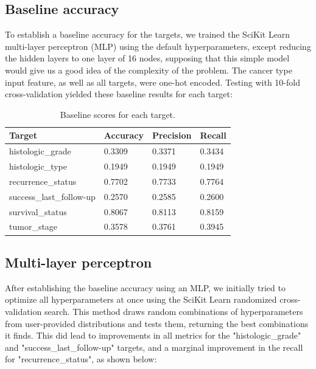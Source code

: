\documentclass{article}
\begin{document}
\subsection{Baseline accuracy}

To establish a baseline accuracy for the targets, we trained the SciKit Learn multi-layer perceptron (MLP) using the default hyperparameters, except reducing the hidden layers to one layer of 16 nodes, supposing that this simple model would give us a good idea of the complexity of the problem. The cancer type input feature, as well as all targets, were one-hot encoded. Testing with 10-fold cross-validation yielded these baseline results for each target:

\medskip

\begin{table}[H]
\begin{center}
\begin{tabular}{ *{4}{l} }
    \multicolumn{1}{p{1.5cm}}{\raggedright Target} &  
    \multicolumn{1}{p{1.5cm}}{\raggedright Accuracy} &  
    \multicolumn{1}{p{1.5cm}}{\raggedright Precision} &  
    \multicolumn{1}{p{1.5cm}}{\raggedright Recall} \\ \hline
histologic\_grade       &         0.3309 &          0.3371 &       0.3434 \\
histologic\_type        &         0.1949 &          0.1949 &       0.1949 \\
recurrence\_status      &         0.7702 &          0.7733 &       0.7764 \\
success\_last\_follow-up &         0.2570 &          0.2585 &       0.2600 \\
survival\_status        &         0.8067 &          0.8113 &       0.8159 \\
tumor\_stage            &         0.3578 &          0.3761 &       0.3945 \\
\end{tabular}
\caption{Baseline scores for each target.}
\end{center}
\end{table}

\subsection{Multi-layer perceptron}

After establishing the baseline accuracy using an MLP, we initially tried to optimize all hyperparameters at once using the SciKit Learn randomized cross-validation search. This method draws random combinations of hyperparameters from user-provided distributions and tests them, returning the best combinations it finds. This did lead to improvements in all metrics for the "histologic\_grade" and "success\_last\_follow-up" targets, and a marginal improvement in the recall for "recurrence\_status", as shown below:
\end{document}
